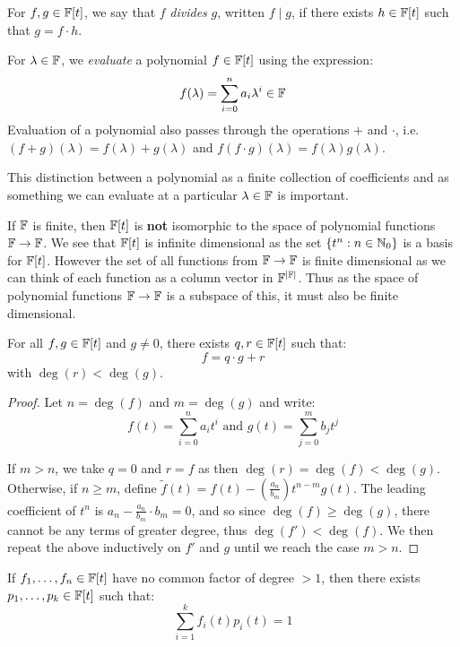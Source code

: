 \documentclass[../main.tex]{subfiles}
\begin{document}
\begin{definition}[Divisible]
  For $f, g \in \mathbb{F}[t]$, we say that $f$ \textit{divides} $g$, written $f \mid g$, if there exists $h \in \mathbb{F}[t]$ such that $g = f \cdot h$.
\end{definition}
For $\lambda \in \mathbb{F}$, we \textit{evaluate} a polynomial $f \in \mathbb{F}[t]$ using the expression:
\[
  f(\lambda) = \sum_{i = 0}^{n} a_i \lambda^i \in \mathbb{F}
\]
Evaluation of a polynomial also passes through the operations $+$ and $\cdot$, i.e. $(f + g)(\lambda) = f(\lambda) + g(\lambda)$ and $f(f \cdot g)(\lambda) = f(\lambda)g(\lambda)$.

\begin{remark}[Warning]
  This distinction between a polynomial as a finite collection of coefficients and as something we can evaluate at a particular $\lambda \in \mathbb{F}$ is important.

  If $\mathbb{F}$ is finite, then $\mathbb{F}[t]$ is \textbf{not} isomorphic to the space of polynomial functions $\mathbb{F} \to \mathbb{F}$.
  We see that $\mathbb{F}[t]$ is infinite dimensional as the set $\{t^n: n \in \mathbb{N}_0\}$ is a basis for $\mathbb{F}[t]$.
  However the set of all functions from $\mathbb{F} \to \mathbb{F}$ is finite dimensional as we can think of each function as a column vector in $\mathbb{F}^{|\mathbb{F}|}$.
  Thus as the space of polynomial functions $\mathbb{F} \to \mathbb{F}$ is a subspace of this, it must also be finite dimensional.
\end{remark}
\begin{proposition}
  For all $f, g \in \mathbb{F}[t]$ and $g \neq 0$, there exists $q, r \in \mathbb{F}[t]$ such that: \label{EAP}
  \[
    f = q \cdot g + r
  \]
  with $\deg(r) < \deg(g)$.
\end{proposition}
\begin{proof}
  Let $n = \deg(f)$ and $m = \deg(g)$ and write:
  \[
    f(t) = \sum_{i = 0}^{n} a_i t^{i} \text{ and } g(t) = \sum_{j = 0}^{m} b_j t^{j}
  \]

  If $m > n$, we take $q = 0$ and $r = f$ as then $\deg(r) = \deg(f) < \deg(g)$.
  Otherwise, if $n \geq m$, define $\widetilde{f}(t) = f(t) - (\frac{a_n}{b_m}) t^{n - m} g(t)$.
  The leading coefficient of $t^n$ is $a_n - \frac{a_n}{b_m} \cdot b_m = 0$, and so since $\deg(f) \geq \deg(g)$, there cannot be any terms of greater degree, thus $\deg(f') < \deg(f)$.
  We then repeat the above inductively on $f'$ and $g$ until we reach the case $m > n$.
\end{proof}
\begin{corollary}
  If $f_1, \ldots, f_n \in \mathbb{F}[t]$ have no common factor of degree $> 1$, then there exists $p_1, \ldots, p_k \in \mathbb{F}[t]$ such that: \label{bezoutsLemma}
  \[
    \sum_{i = 1}^{k} f_i(t)p_i(t) = 1
  \]
\end{corollary}
\end{document}
